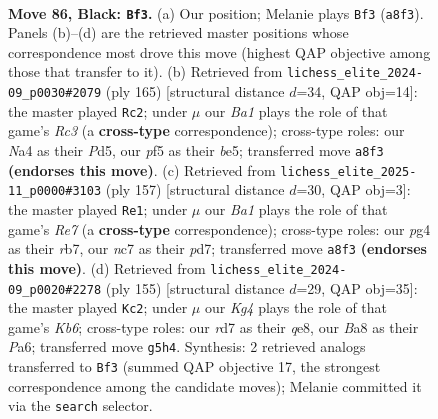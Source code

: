 \documentclass[11pt]{article}
\begin{document}
\clearpage

\begin{figure}[p]\centering
\begin{subfigure}{0.46\textwidth}\centering
\resizebox{\linewidth}{!}{%
\newchessgame
\chessboard[
  setfen={b7/2NR4/8/5Pk1/np4P1/8/7P/5BK1 b - - 1 86},
  showmover=false,
  pgfstyle=straightmove, color=movearrow, markmove={a8-f3}
]}
\caption{}
\end{subfigure}\hfill
\begin{subfigure}{0.46\textwidth}\centering
\resizebox{\linewidth}{!}{%
\newchessgame
\chessboard[
  setfen={8/8/2r5/3pB3/3P2PR/3k4/5PK1/8 b - - 0 83},
  showmover=false,
  pgfstyle=straightmove, color=movearrow, markmove={c6-c2}
]}
\caption{}
\end{subfigure}
\\[4pt]
\begin{subfigure}{0.46\textwidth}\centering
\resizebox{\linewidth}{!}{%
\newchessgame
\chessboard[
  setfen={8/1R1P4/5b2/2k5/1p2PB2/pP3K2/4r3/8 b - - 2 79},
  showmover=false,
  pgfstyle=straightmove, color=movearrow, markmove={e2-e1}
]}
\caption{}
\end{subfigure}\hfill
\begin{subfigure}{0.46\textwidth}\centering
\resizebox{\linewidth}{!}{%
\newchessgame
\chessboard[
  setfen={4Q3/6K1/p2P2N1/P7/8/1kP5/1P6/8 b - - 0 78},
  showmover=false,
  pgfstyle=straightmove, color=movearrow, markmove={b3-c2}
]}
\caption{}
\end{subfigure}
\caption{\textbf{Move 86, Black: \texttt{Bf3}.} (a) Our position; Melanie plays \texttt{Bf3} (\texttt{a8f3}). Panels (b)--(d) are the retrieved master positions whose correspondence most drove this move (highest QAP objective among those that transfer to it). (b) Retrieved from \texttt{lichess\_elite\_2024-09\_p0030\#2079} (ply 165) [structural distance $d$=34, QAP obj=14]: the master played \texttt{Rc2}; under $\mu$ our \emph{Ba1} plays the role of that game's \emph{Rc3} (a \textbf{cross-type} correspondence); cross-type roles: our \emph{N}a4 as their \emph{P}d5, our \emph{p}f5 as their \emph{b}e5; transferred move \texttt{a8f3} \textbf{(endorses this move)}. (c) Retrieved from \texttt{lichess\_elite\_2025-11\_p0000\#3103} (ply 157) [structural distance $d$=30, QAP obj=3]: the master played \texttt{Re1}; under $\mu$ our \emph{Ba1} plays the role of that game's \emph{Re7} (a \textbf{cross-type} correspondence); cross-type roles: our \emph{p}g4 as their \emph{r}b7, our \emph{n}c7 as their \emph{p}d7; transferred move \texttt{a8f3} \textbf{(endorses this move)}. (d) Retrieved from \texttt{lichess\_elite\_2024-09\_p0020\#2278} (ply 155) [structural distance $d$=29, QAP obj=35]: the master played \texttt{Kc2}; under $\mu$ our \emph{Kg4} plays the role of that game's \emph{Kb6}; cross-type roles: our \emph{r}d7 as their \emph{q}e8, our \emph{B}a8 as their \emph{P}a6; transferred move \texttt{g5h4}. Synthesis: 2 retrieved analogs transferred to \texttt{Bf3} (summed QAP objective 17, the strongest correspondence among the candidate moves); Melanie committed it via the \texttt{search} selector.}
\label{fig:thought-m171}
\end{figure}
\end{document}
